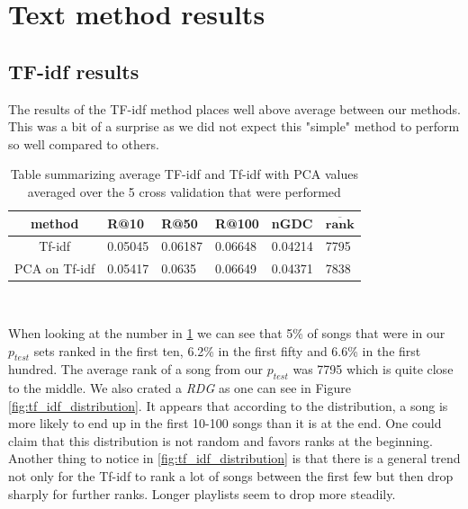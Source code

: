 \section{Text method results}\label{sec:text_results}

\subsection{TF-idf results}\label{ssec:tf_idf_results}

The results of the TF-idf method places well above average between our methods. This was a bit of a surprise as we did not expect this "simple" method to perform so well compared to others. \\

\begin{table}[h]
\centering
\renewcommand{\arraystretch}{1.5}
\begin{tabu} to 1\textwidth {| c || X[c] | X[c] | X[c] | X[c] | X[c] | }
 \hline
 \textbf{method} & \textbf{R@10} & \textbf{R@50} & \textbf{R@100} & \textbf{nGDC} & $ \boldsymbol{\overline{rank}} $ \\
 \hline
 \hline
 Tf-idf & 0.05045 & 0.06187 & 0.06648 & 0.04214 & 7795 \\
 \hline
 PCA on Tf-idf & 0.05417 & 0.0635 & 0.06649 & 0.04371 & 7838 \\
 \hline
\end{tabu} \\
\caption{Table summarizing average TF-idf and Tf-idf with PCA values averaged over the 5 cross validation that were performed}
\label{table:1}
\end{table}

When looking at the number in \ref{table:1} we can see that 5\% of songs that were in our $p_{test}$ sets ranked in the first ten, 6.2\% in the first fifty and 6.6\% in the first hundred. The average rank of a song from our $p_{test}$ was 7795 which is quite close to the middle. We also crated a \textit{RDG} as one can see in Figure \ref{fig:tf_idf_distribution}. It appears that according to the distribution, a song is more likely to end up in the first 10-100 songs than it is at the end. One could claim that this distribution is not random and favors ranks at the beginning.\\
Another thing to notice in \ref{fig:tf_idf_distribution} is that there is a general trend not only for the Tf-idf to rank a lot of songs between the first few but then drop sharply for further ranks. Longer playlists seem to drop more steadily.

